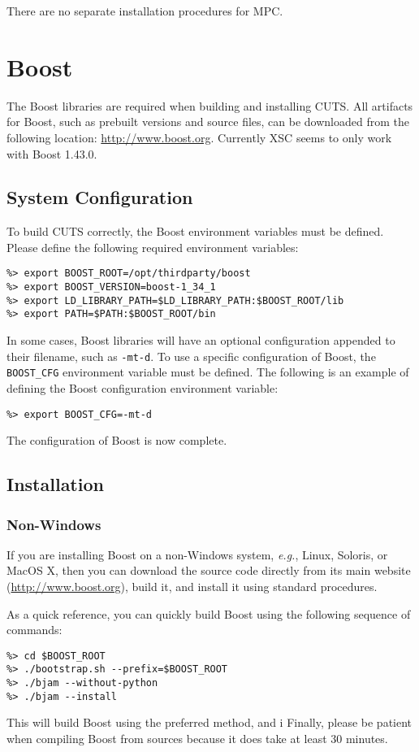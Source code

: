 There are no separate installation procedures for MPC.

\section{Boost}
\label{sec:thirdparty-boost}

The Boost libraries are required when building and installing CUTS. All
artifacts for Boost, such as prebuilt versions and source files, can be 
downloaded from the following location: \url{http://www.boost.org}. Currently XSC seems to only work with Boost 1.43.0.

\subsection{System Configuration}

To build CUTS correctly, the Boost environment variables must be defined. Please 
define the following required environment variables:
\begin{lstlisting}
%> export BOOST_ROOT=/opt/thirdparty/boost
%> export BOOST_VERSION=boost-1_34_1
%> export LD_LIBRARY_PATH=$LD_LIBRARY_PATH:$BOOST_ROOT/lib
%> export PATH=$PATH:$BOOST_ROOT/bin
\end{lstlisting}
In some cases, Boost libraries will have an optional configuration appended to 
their filename, such as \texttt{-mt-d}. To use a specific configuration of 
Boost, the \texttt{BOOST\_CFG} environment variable must be defined. The 
following is an example of defining the Boost configuration environment 
variable:
\begin{lstlisting}
%> export BOOST_CFG=-mt-d
\end{lstlisting}
The configuration of Boost is now complete. 

\subsection{Installation}

\subsubsection{Non-Windows}
 
If you are installing Boost on a non-Windows system, \textit{e.g.}, Linux, 
Soloris, or MacOS X, then you can download the source code directly from its
main website (\url{http://www.boost.org}), build it, and install it using
standard procedures.

As a quick reference, you can quickly build Boost using the following
sequence of commands:
\begin{lstlisting}
%> cd $BOOST_ROOT
%> ./bootstrap.sh --prefix=$BOOST_ROOT
%> ./bjam --without-python
%> ./bjam --install
\end{lstlisting}
This will build Boost using the preferred method, and i
Finally, please be patient when compiling Boost from sources 
because it does take at least 30 minutes. 

